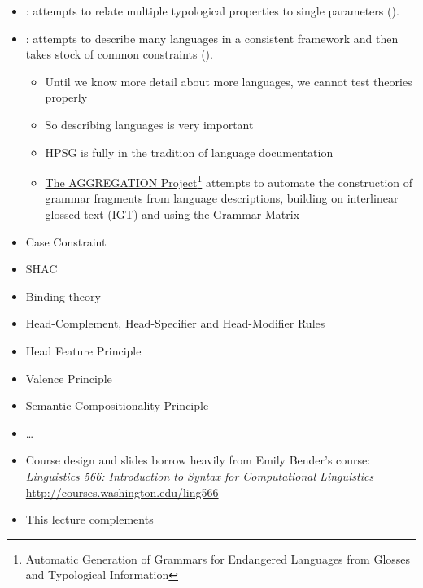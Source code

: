 \documentclass[a4paper,landscape,headrule,footrule]{foils}
\begin{document}
\begin{itemize}
\item {}: attempts to relate multiple 
typological properties to single parameters ().
\item {}: attempts to 
describe many languages in a consistent 
framework and then takes stock of common 
constraints ().
\begin{itemize}
\item Until we know more detail about more languages, we cannot test theories properly
\item So describing languages  is very important
\item HPSG is fully in the tradition of language documentation
\item \href{http://depts.washington.edu/uwcl/aggregation/}{The
    AGGREGATION Project}\footnote{Automatic Generation of Grammars for
    Endangered Languages from Glosses and Typological Information}
  attempts to automate the construction of grammar fragments from
  language descriptions, building on interlinear glossed text (IGT)
  and using the Grammar Matrix
\end{itemize}
\end{itemize}

\begin{itemize}
\item Case Constraint
\item SHAC
\item Binding theory
\item Head-Complement, Head-Specifier and Head-Modifier Rules
\item Head Feature Principle
\item Valence Principle
\item Semantic Compositionality Principle
\item \ldots{}
\end{itemize}

\overview
{}


\begin{itemize}
\item Course design and slides borrow heavily from Emily Bender's course:
\textit{Linguistics 566: Introduction to Syntax for Computational Linguistics}
\\ \url{http://courses.washington.edu/ling566}
\item This lecture complements \citet[Chapter 9]{sag:wasow:bender:2003}
\end{itemize}


\end{document}
